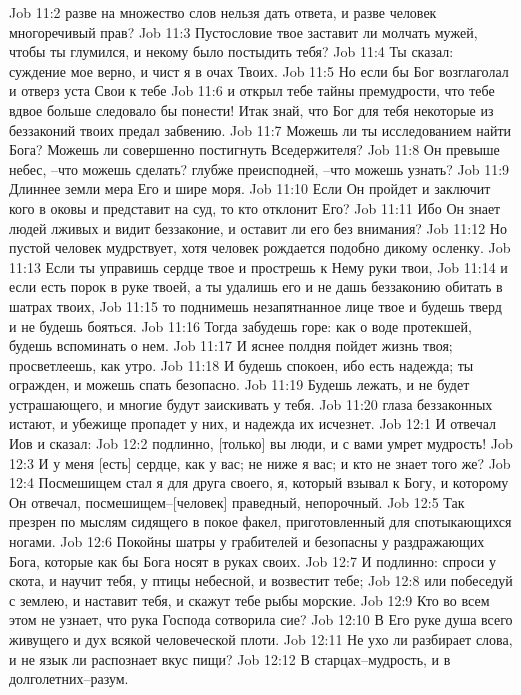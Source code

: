 Job 11:2  разве на множество слов нельзя дать ответа, и разве человек многоречивый прав?
Job 11:3  Пустословие твое заставит ли молчать мужей, чтобы ты глумился, и некому было постыдить тебя?
Job 11:4  Ты сказал: суждение мое верно, и чист я в очах Твоих.
Job 11:5  Но если бы Бог возглаголал и отверз уста Свои к тебе
Job 11:6  и открыл тебе тайны премудрости, что тебе вдвое больше следовало бы понести! Итак знай, что Бог для тебя некоторые из беззаконий твоих предал забвению.
Job 11:7  Можешь ли ты исследованием найти Бога? Можешь ли совершенно постигнуть Вседержителя?
Job 11:8  Он превыше небес, --что можешь сделать? глубже преисподней, --что можешь узнать?
Job 11:9  Длиннее земли мера Его и шире моря.
Job 11:10  Если Он пройдет и заключит кого в оковы и представит на суд, то кто отклонит Его?
Job 11:11  Ибо Он знает людей лживых и видит беззаконие, и оставит ли его без внимания?
Job 11:12  Но пустой человек мудрствует, хотя человек рождается подобно дикому осленку.
Job 11:13  Если ты управишь сердце твое и прострешь к Нему руки твои,
Job 11:14  и если есть порок в руке твоей, а ты удалишь его и не дашь беззаконию обитать в шатрах твоих,
Job 11:15  то поднимешь незапятнанное лице твое и будешь тверд и не будешь бояться.
Job 11:16  Тогда забудешь горе: как о воде протекшей, будешь вспоминать о нем.
Job 11:17  И яснее полдня пойдет жизнь твоя; просветлеешь, как утро.
Job 11:18  И будешь спокоен, ибо есть надежда; ты огражден, и можешь спать безопасно.
Job 11:19  Будешь лежать, и не будет устрашающего, и многие будут заискивать у тебя.
Job 11:20  глаза беззаконных истают, и убежище пропадет у них, и надежда их исчезнет.
Job 12:1  И отвечал Иов и сказал:
Job 12:2  подлинно, [только] вы люди, и с вами умрет мудрость!
Job 12:3  И у меня [есть] сердце, как у вас; не ниже я вас; и кто не знает того же?
Job 12:4  Посмешищем стал я для друга своего, я, который взывал к Богу, и которому Он отвечал, посмешищем--[человек] праведный, непорочный.
Job 12:5  Так презрен по мыслям сидящего в покое факел, приготовленный для спотыкающихся ногами.
Job 12:6  Покойны шатры у грабителей и безопасны у раздражающих Бога, которые как бы Бога носят в руках своих.
Job 12:7  И подлинно: спроси у скота, и научит тебя, у птицы небесной, и возвестит тебе;
Job 12:8  или побеседуй с землею, и наставит тебя, и скажут тебе рыбы морские.
Job 12:9  Кто во всем этом не узнает, что рука Господа сотворила сие?
Job 12:10  В Его руке душа всего живущего и дух всякой человеческой плоти.
Job 12:11  Не ухо ли разбирает слова, и не язык ли распознает вкус пищи?
Job 12:12  В старцах--мудрость, и в долголетних--разум.
